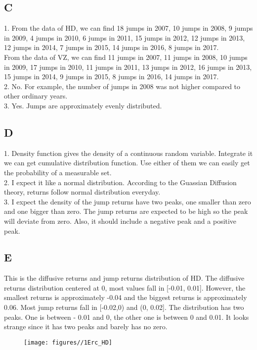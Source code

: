 \documentclass{report}
\begin{document}
\subsection{C}
1. From the data of HD, we can find 18 jumps in 2007, 10 jumps in 2008,  9 jumps in 2009, 4 jumps in 2010, 6 jumps in 2011, 15 jumps in 2012, 12 jumps in 2013, 12 jumps in 2014, 7 jumps in 2015, 14 jumps in 2016, 8 jumps in 2017.\\
From the data of VZ, we can find 11 jumps in 2007, 11 jumps in 2008,  10 jumps in 2009, 17 jumps in 2010, 11 jumps in 2011, 13 jumps in 2012, 16 jumps in 2013, 15 jumps in 2014, 9 jumps in 2015, 8 jumps in 2016, 14 jumps in 2017.\\
2. No. For example, the number of jumps in 2008 was not higher compared to other ordinary years.\\
3. Yes. Jumps are approximately evenly distributed.

\subsection{D}
1. Density function gives the density of a continuous random variable. Integrate it we can get cumulative distribution function. Use either of them we can easily get the probability of a measurable set.\\
2. I expect it like a normal distribution. According to the Guassian Diffusion theory, returns follow normal distribution everyday. \\
3. I expect the density of the jump returns have two peaks, one smaller than zero and one bigger than zero. The jump returns are expected to be high so the peak will deviate from zero. Also, it should include a negative peak and a positive peak. 

\subsection{E}
This is the diffusive returns and jump returns distribution of HD. The diffusive returns distribution centered at 0, most values fall in [-0.01, 0.01]. However, the smallest returns is approximately -0.04 and the biggest returns is approximately 0.06. Most jump returns fall in [-0.02,0) and (0, 0.02]. The distribution has two peaks. One is between - 0.01 and 0, the other one is between 0 and 0.01.  It looks strange since it has two peaks and barely has no zero.
\begin{figure}[H]
        \centering 
         \texttt{[image: figures//1Erc\_HD]}
\end{figure}
\end{document}
